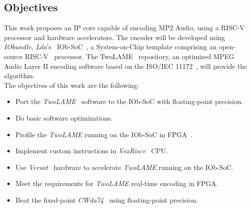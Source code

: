 \subsection{Objectives}

This work proposes an IP core capable of encoding MP2 Audio, using a RISC-V processor and hardware accelerators. The encoder will be developed using \textit{IObundle, Lda}'s~\cite{iobundle} IOb-SoC~\cite{bib:iobsoc-github}, a System-on-Chip template comprising an open-source RISC-V~\cite{riscv} processor. The TwoLAME~\cite{twolamerepo} repository, an optimized MPEG Audio Layer II encoding software based on the ISO/IEC 11172~\cite{11172}, will provide the algorithm.\\
The objectives of this work are the following:

\begin{itemize}
    \item Port the \textit{TwoLAME}~\cite{twolame} software to the IOb-SoC with floating-point precision.
    \item Do basic software optimizations.
    \item Profile the \textit{TwoLAME} running on the IOb-SoC in FPGA~\cite{fpga}.
    \item Implement custom instructions in \textit{VexRiscv}~\cite{vexriscv} CPU. 
    \item Use \textit{Versat}~\cite{bib:iobversat} hardware to accelerate \textit{TwoLAME} running on the IOb-SoC.
    \item Meet the requirements for \textit{TwoLAME} real-time encoding in FPGA.
    \item Beat the fixed-point \textit{CWda74}~\cite{CWda74} using floating-point precision.
\end{itemize}




